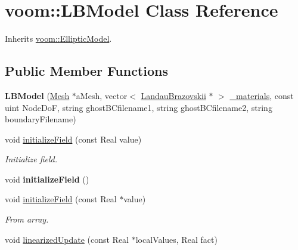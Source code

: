 \hypertarget{classvoom_1_1_l_b_model}{
\section{voom::LBModel Class Reference}
\label{classvoom_1_1_l_b_model}
}


Inherits \hyperlink{classvoom_1_1_elliptic_model}{voom::EllipticModel}.\subsection*{Public Member Functions}
\begin{DoxyCompactItemize}
\item 
\hypertarget{classvoom_1_1_l_b_model_abb5d9a1b8ad83a5a16adf5f8b6fd91bc}{
{\bfseries LBModel} (\hyperlink{classvoom_1_1_mesh}{Mesh} $\ast$aMesh, vector$<$ \hyperlink{classvoom_1_1_landau_brazovskii}{LandauBrazovskii} $\ast$ $>$ \hyperlink{classvoom_1_1_l_b_model_a7bb53d098be6d2d501b8b9c7914f07d6}{\_\-materials}, const uint NodeDoF, string ghostBCfilename1, string ghostBCfilename2, string boundaryFilename)}
\label{classvoom_1_1_l_b_model_abb5d9a1b8ad83a5a16adf5f8b6fd91bc}

\item 
\hypertarget{classvoom_1_1_l_b_model_aa589083d7513e8516c3ee385aeca3929}{
void \hyperlink{classvoom_1_1_l_b_model_aa589083d7513e8516c3ee385aeca3929}{initializeField} (const Real value)}
\label{classvoom_1_1_l_b_model_aa589083d7513e8516c3ee385aeca3929}

\begin{DoxyCompactList}\small\item\em Initialize field. \item\end{DoxyCompactList}\item 
\hypertarget{classvoom_1_1_l_b_model_a6e5f0d96cd34cec0b872c9a59a9f50be}{
void {\bfseries initializeField} ()}
\label{classvoom_1_1_l_b_model_a6e5f0d96cd34cec0b872c9a59a9f50be}

\item 
\hypertarget{classvoom_1_1_l_b_model_aa171a0b1291cf9bb970e1ea0b45c2865}{
void \hyperlink{classvoom_1_1_l_b_model_aa171a0b1291cf9bb970e1ea0b45c2865}{initializeField} (const Real $\ast$value)}
\label{classvoom_1_1_l_b_model_aa171a0b1291cf9bb970e1ea0b45c2865}

\begin{DoxyCompactList}\small\item\em From array. \item\end{DoxyCompactList}\item 
\hypertarget{classvoom_1_1_l_b_model_a83d3423b69f41d24b241fd70ddab0fd1}{
void \hyperlink{classvoom_1_1_l_b_model_a83d3423b69f41d24b241fd70ddab0fd1}{linearizedUpdate} (const Real $\ast$localValues, Real fact)}
\label{classvoom_1_1_l_b_model_a83d3423b69f41d24b241fd70ddab0fd1}


\end{DoxyCompactItemize}
